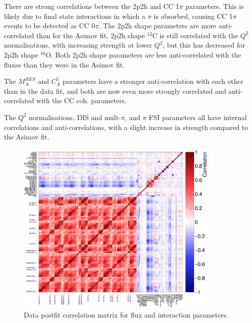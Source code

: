 There are strong correlations between the 2p2h and CC 1$\pi$ parameters. This is likely due to final state interactions in which a $\pi$ is absorbed, causing CC 1$\pi$ events to be detected as CC 0$\pi$. The 2p2h shape parameters are more anti-correlated than for the Asimov fit. 2p2h shape $^{12}$C is still correlated with the $Q^2$ normalisations, with increasing strength at lower $Q^2$, but this has decreased for 2p2h shape $^{16}$O. Both 2p2h shape parameters are less anti-correlated with the fluxes than they were in the Asimov fit.

The $M_{A}^{RES}$ and $C_{A}^5$ parameters have a stronger anti-correlation with each other than in the data fit, and both are now even more strongly correlated and anti-correlated with the CC coh. parameters.

The $Q^2$ normalisations, DIS and mult-$\pi$, and $\pi$ FSI parameters all have internal correlations and anti-correlations, with a slight increase in strength compared to the Asimov fit. 

\begin{figure}[!htbp]
\centering
\includegraphics*[width=0.9\textwidth,clip]{figs/MaCh3DataCorr}
\caption{Data postfit correlation matrix for flux and interaction parameters.}\label{fig:datpostfitcov}
\end{figure}

